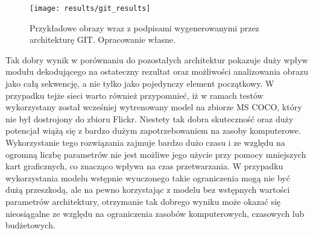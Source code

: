 \begin{figure}[H]
    \centering
    \texttt{[image: results/git\_results]}
    \caption{Przykładowe obrazy wraz z podpisami wygenerowanymi przez architekturę GIT. Opracowanie własne.}
    \label{fig:results-git}
\end{figure}
\noindent Tak dobry wynik w porównaniu do pozostałych architektur pokazuje duży wpływ modułu dekodującego na ostateczny rezultat oraz możliwości analizowania obrazu jako całą sekwencję, a nie tylko jako pojedynczy element początkowy. W przypadku tejże sieci warto również przypomnieć, iż w ramach testów wykorzystany został wcześniej wytrenowany model na zbiorze MS COCO, który nie był dostrojony do zbioru Flickr. Niestety tak dobra skuteczność oraz duży potencjał wiążą się z bardzo dużym zapotrzebowaniem na zasoby komputerowe. Wykorzystanie tego rozwiązania zajmuje bardzo dużo czasu i ze względu na ogromną liczbę parametrów nie jest możliwe jego użycie przy pomocy mniejszych kart graficznych, co znacząco wpływa na czas przetwarzania. W przypadku wykorzystania modelu wstępnie wyuczonego takie ograniczenia mogą nie być dużą przeszkodą, ale na pewno korzystając z modelu bez wstępnych wartości parametrów architektury, otrzymanie tak dobrego wyniku może okazać się nieosiągalne ze względu na ograniczenia zasobów komputerowych, czasowych lub budżetowych.

